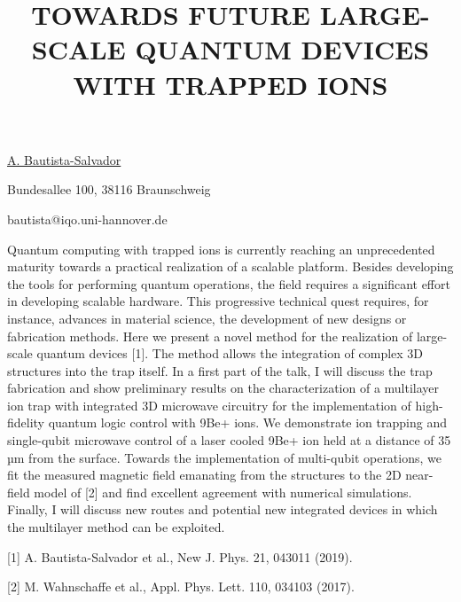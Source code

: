 \title{TOWARDS FUTURE LARGE-SCALE QUANTUM DEVICES WITH TRAPPED IONS}

\underline{A. Bautista-Salvador}  

{\normalsize{\vspace{-4mm}
Bundesallee 100, 38116 Braunschweig



\email bautista@iqo.uni-hannover.de}}

Quantum computing with trapped ions is currently reaching an unprecedented maturity towards a practical realization of a scalable platform. Besides developing the tools for performing quantum operations, the field requires a significant effort in developing scalable hardware. This progressive technical quest requires, for instance, advances in material science, the development of new designs or fabrication methods. Here we present a novel method for the realization of large-scale quantum devices [1]. The method allows the integration of complex 3D structures into the trap itself. In a first part of the talk, I will discuss the trap fabrication and show preliminary results on the characterization of a multilayer ion trap with integrated 3D microwave circuitry for the implementation of high-fidelity quantum logic control with 9Be+ ions. We demonstrate ion trapping and single-qubit microwave control of a laser cooled 9Be+ ion held at a distance of 35 µm from the surface. Towards the implementation of multi-qubit operations, we fit the measured magnetic field emanating from the structures to the 2D near-field model of [2] and find excellent agreement with numerical simulations. Finally, I will discuss new routes and potential new integrated devices in which the multilayer method can be exploited.

{\normalsize
[1] A. Bautista-Salvador et al., New J. Phys. 21, 043011 (2019).
\vsp

[2] M. Wahnschaffe et al., Appl. Phys. Lett. 110, 034103 (2017).
}

\vspace{\baselineskip}